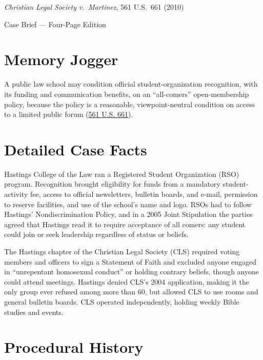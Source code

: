 \documentclass[12pt]{article}
\begin{document}
\begin{center}
{\LARGE \textit{Christian Legal Society v.\ Martinez}, 561 U.S.\ 661 (2010)\par}
\vspace{0.8em}
{\large Case Brief --- Four-Page Edition\par}
\end{center}
\vspace{1em}

\section{Memory Jogger}

A public law school may condition official student-organization recognition, with its funding and communication benefits, on an ``all-comers'' open-membership policy, because the policy is a reasonable, viewpoint-neutral condition on access to a limited public forum (\href{https://supreme.justia.com/cases/federal/us/561/661/}{561 U.S. 661}).

\section{Detailed Case Facts}

Hastings College of the Law ran a Registered Student Organization (RSO) program. Recognition brought eligibility for funds from a mandatory student-activity fee, access to official newsletters, bulletin boards, and e-mail, permission to reserve facilities, and use of the school's name and logo. RSOs had to follow Hastings' Nondiscrimination Policy, and in a 2005 Joint Stipulation the parties agreed that Hastings read it to require acceptance of all comers: any student could join or seek leadership regardless of status or beliefs.

The Hastings chapter of the Christian Legal Society (CLS) required voting members and officers to sign a Statement of Faith and excluded anyone engaged in ``unrepentant homosexual conduct'' or holding contrary beliefs, though anyone could attend meetings. Hastings denied CLS's 2004 application, making it the only group ever refused among more than 60, but allowed CLS to use rooms and general bulletin boards. CLS operated independently, holding weekly Bible studies and events.

\section{Procedural History}
\end{document}
